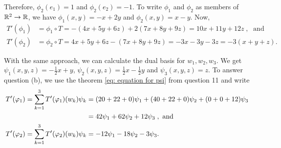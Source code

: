 \begin{xrcs}
\begin{xsol}
    Therefore, $\phi_2(e_1) = 1$ and $\phi_2(e_2) = -1$. To write $\phi_1$ and $\phi_2$ as members of $\mathbb{R}^2 \to \mathbb{R}$, we have $\phi_1(x,y) = -x + 2y$ and $\phi_2 (x,y) = x-y$. Now,
    \begin{equation}
      \begin{aligned}
        T'(\phi_1) &= \phi_1 \circ T = -(4x + 5y + 6z) + 2          (7x + 8y + 9z) = 10x + 11y + 12z \; , \;  \text{ and }  \\
        T'(\phi_2) &= \phi_2 \circ T = 4x + 5y + 6z - (7x + 8y + 9z) = -3x -3y -3z = -3(x+y+z).
      \end{aligned}
    \end{equation}

    With the same approach, we can calculate the dual basis for $w_1, w_2, w_3$. We get $\psi_1(x,y,z) = -\frac{1}{2}x + y$, $\psi_2(x,y,z) = \frac{1}{2}x - \frac{1}{2}y$ and $\psi_3(x,y,z) = z$. To answer question (b), we use the theorem \eqref{eq: equation for psi} from question 11 and write
    \begin{equation}
      \begin{aligned}
        \displaystyle T' (\varphi_1) =  \sum_{k=1}^{3} \displaystyle T' (\varphi_1) (w_k) \psi_k &= (20+22+0) \psi_1 + (40+22+0) \psi_2 + (0+0+12 )\psi_3 \\
        & = 42 \psi_1 + 62 \psi_2 + 12 \psi_3  \; , \text{ and }  \\
        \displaystyle T' (\varphi_2) =  \sum_{k=1}^{3} \displaystyle T' (\varphi_2) (w_k) \psi_k &= -12 \psi_1 -18 \psi_2 -3 \psi_3. \;
      \end{aligned}
    \end{equation}
  \end{xsol}
\end{xrcs}

